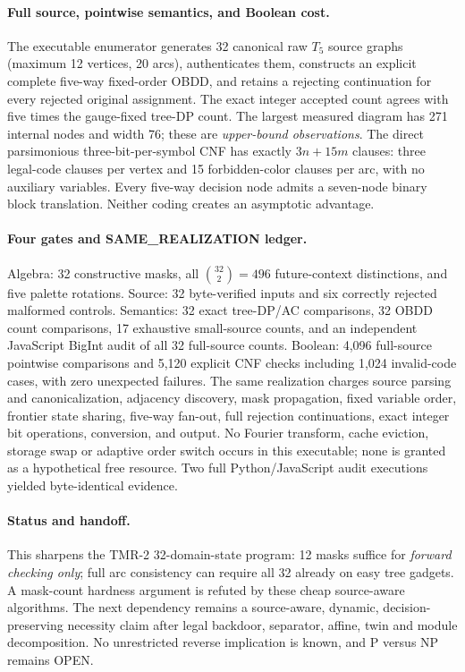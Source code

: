 \documentclass[11pt]{article}
\begin{document}
\paragraph{Full source, pointwise semantics, and Boolean cost.}
The executable enumerator generates 32 canonical raw \(T_5\) source
graphs (maximum 12 vertices, 20 arcs), authenticates them,
constructs an explicit complete five-way fixed-order OBDD,
and retains a rejecting continuation for every rejected
original assignment. The exact integer accepted count agrees
with five times the gauge-fixed tree-DP count.
The largest measured diagram has 271 internal nodes
and width 76; these are \emph{upper-bound observations}.
The direct parsimonious three-bit-per-symbol CNF has exactly
\(3n+15m\) clauses: three legal-code clauses per vertex and
15 forbidden-color clauses per arc, with no auxiliary variables.
Every five-way decision node admits a seven-node binary
block translation. Neither coding creates an asymptotic advantage.

\paragraph{Four gates and SAME\_REALIZATION ledger.}
Algebra: 32 constructive masks, all
\(\binom{32}{2}=496\) future-context distinctions, and
five palette rotations. Source: 32 byte-verified
inputs and six correctly rejected malformed controls.
Semantics: 32 exact tree-DP/AC comparisons,
32 OBDD count comparisons, 17 exhaustive small-source
counts, and an independent JavaScript BigInt audit of
all 32 full-source counts.
Boolean: 4,096 full-source pointwise comparisons and
5,120 explicit CNF checks including 1,024 invalid-code
cases, with zero unexpected failures.
The same realization charges source parsing and
canonicalization, adjacency discovery, mask propagation,
fixed variable order, frontier state sharing, five-way
fan-out, full rejection continuations, exact integer bit
operations, conversion, and output. No Fourier
transform, cache eviction, storage swap or
adaptive order switch occurs in this executable;
none is granted as a hypothetical free resource.
Two full Python/JavaScript audit executions yielded
byte-identical evidence.

\paragraph{Status and handoff.}
This sharpens the TMR-2 32-domain-state program:
12 masks suffice for \emph{forward checking only};
full arc consistency can require all 32 already on
easy tree gadgets. A mask-count hardness argument is
refuted by these cheap source-aware algorithms.
The next dependency remains a source-aware, dynamic,
decision-preserving necessity claim after legal backdoor,
separator, affine, twin and module decomposition.
No unrestricted reverse implication is known,
and P versus NP remains OPEN.
\end{document}

